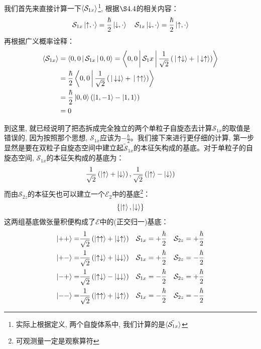 \documentclass[a4paper,zihao=-4,linespread=1]{ctexrep}
\begin{document}
    我们首先来直接计算一下$\braket{\mathcal{S}_{1x}}$\footnote{实际上根据定义, 两个自旋体系中, 我们计算的是$\braket{\tilde{\mathcal{S}_{1x}}}$}, 根据$\S 4.4$的相关内容：
    \[\mathcal{S}_{1x}\ket{\uparrow,\cdot}=\frac{\hbar}{2}\ket{\downarrow,\cdot}\quad\mathcal{S}_{1x}\ket{\downarrow,\cdot}=\frac{\hbar}{2}\ket{\uparrow,\cdot}\]
    再根据广义概率诠释：
    \begin{align*}
        \braket{\mathcal{S}_{1x}}&=\Braket{0,0|\mathcal{S}_{1x}|0,0}=\Braket{0,0|\mathcal{S}_1x|\frac{1}{\sqrt{2}}\left(\ket{\uparrow\downarrow}+\ket{\downarrow\uparrow}\right)}\\
        &=\frac{\hbar}{2}\Braket{0,0|\frac{1}{\sqrt{2}}\left(\ket{\downarrow\downarrow}+\ket{\uparrow\uparrow}\right)}\\
        &=\frac{\hbar}{2}\ket{0,0}\left(\ket{1,-1}-\ket{1,1}\right)\\
        &=0
    \end{align*}
    
    到这里, 就已经说明了把态拆成完全独立的两个单粒子自旋态去计算$\mathcal{S}_{1x}$的取值是错误的, 因为按照那个思想, $\mathcal{S}_{1x}$应该为$-\frac{\hbar}{2}$。我们接下来进行更仔细的计算,
    第一步显然是要在双粒子自旋态空间中建立起$\tilde{\mathcal{S}}_{1x}$的本征矢构成的基底。对于单粒子的自旋态空间, $\mathcal{S}_{1x}$的本征矢构成的基底为：
    \[\frac{1}{\sqrt{2}}\left(\ket{\uparrow}+\ket{\downarrow}\right),\frac{1}{\sqrt{2}}\left(\ket{\uparrow}-\ket{\downarrow}\right)\]
    而由$\mathcal{S}_{2z}$的本征矢也可以建立一个$\mathscr{E}_2$中的基底\footnote{可观测量一定是观察算符}：
    \[\{\ket{\uparrow},\ket{\downarrow}\}\]
    这两组基底做张量积便构成了$\mathscr{E}$中的(正交归一)基底：
    \begin{align*}
        \ket{++}=&\frac{1}{\sqrt{2}}\left(\ket{\uparrow\uparrow}+\ket{\downarrow\uparrow}\right)&\mathcal{S}_{1x}&=+\frac{\hbar}{2}&\mathcal{S}_{2z}&=+\frac{\hbar}{2}\\
        \ket{+-}=&\frac{1}{\sqrt{2}}\left(\ket{\uparrow\downarrow}+\ket{\downarrow\downarrow}\right)&\mathcal{S}_{1x}&=+\frac{\hbar}{2}&\mathcal{S}_{2z}&=-\frac{\hbar}{2}\\
        \ket{-+}=&\frac{1}{\sqrt{2}}\left(\ket{\uparrow\downarrow}-\ket{\downarrow\downarrow}\right)&\mathcal{S}_{1x}&=-\frac{\hbar}{2}&\mathcal{S}_{2z}&=+\frac{\hbar}{2}\\
        \ket{--}=&\frac{1}{\sqrt{2}}\left(\ket{\uparrow\uparrow}+\ket{\downarrow\uparrow}\right)&\mathcal{S}_{1x}&=-\frac{\hbar}{2}&\mathcal{S}_{2z}&=-\frac{\hbar}{2}
    \end{align*}
    
\end{document}
